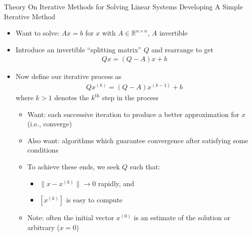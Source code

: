 \documentclass[9pt, serif]{beamer}
\newlength{\wideitemsep}
\let\olditem\item
\renewcommand{\item}{\setlength{\itemsep}{\wideitemsep}\olditem}
\newcommand{\bi}{\begin{itemize}}
\newcommand{\ei}{\end{itemize}}
\newcommand{\norm}[1]{\lVert#1\rVert}
\begin{document}
\begin{frame}{Theory On Iterative Methods for Solving Linear Systems}
    \pause
    Developing A Simple Iterative Method \pause
    \bi
        \item Want to solve: $Ax=b$ for $x$ with $A \in \mathbb{R}^{n \times n}$, $A$ invertible \pause
        \item Introduce an invertible ``splitting matrix'' $Q$ and rearrange to get
	    \begin{align*}
		    Qx = (Q - A)x + b
	    \end{align*} \pause
        \vspace{-5mm}
        \item Now define our iterative process as
	    \begin{align*}
		    Qx^{(k)} = (Q - A)x^{(k-1)} + b
	    \end{align*}
        where $k > 1$ denotes the $k^{\text{th}}$ step in the process \pause
        \bi
            \item Want: each successive iteration to produce a better approximation for $x$ (i.e., converge) \pause
	        \item Also want: algorithms which guarantee convergence after satisfying some conditions \pause
            \item To achieve these ends, we seek $Q$ such that:
            \bi
                \item $\norm{x-x^{(k)}} \to 0$ rapidly, and
                \item $\left[x^{(k)}\right]$ is easy to compute
            \ei \pause
            \item Note: often the initial vector $x^{(0)}$ is an estimate of the solution or arbitrary ($x = 0$)
        \ei
    \ei
\end{frame}
\end{document}
